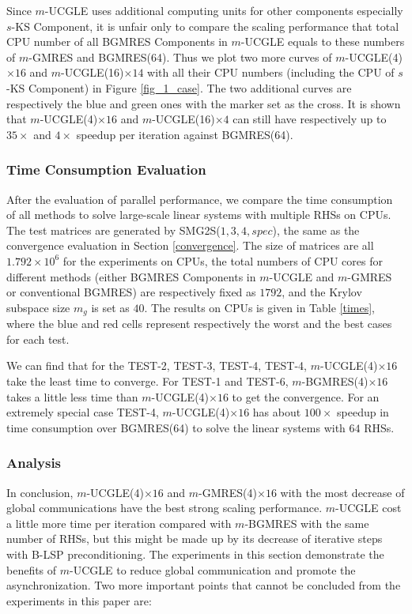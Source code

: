 Since $m$-UCGLE uses additional computing units for other components especially $s$-KS Component, it is unfair only to compare the scaling performance that total CPU number of all BGMRES Components in $m$-UCGLE equals to these numbers of $m$-GMRES and BGMRES(64). Thus we plot two more curves of $m$-UCGLE(4)$\times 16$ and $m$-UCGLE(16)$\times 14$ with all their CPU numbers (including the CPU of $s$-KS Component) in Figure \ref{fig_1_case}. The two additional curves are respectively the blue and green ones with the marker set as the cross. It is shown that $m$-UCGLE(4)$\times 16$ and $m$-UCGLE(16)$\times 4$ can still have respectively up to $35\times$ and $4 \times$ speedup per iteration against BGMRES(64).


\subsubsection{Time Consumption Evaluation}

After the evaluation of parallel performance, we compare the time consumption of all methods to solve large-scale linear systems with multiple RHSs on CPUs. The test matrices are generated by SMG2S($1,3,4, spec$), the same as the convergence evaluation in Section \ref{convergence}. The size of matrices are all $1.792 \times 10^6$ for the experiments on CPUs, the total numbers of CPU cores for different methods (either BGMRES Components in $m$-UCGLE and $m$-GMRES or conventional BGMRES) are respectively fixed as $1792$, and the Krylov subspace size $m_g$ is set as $40$. The results on CPUs is given in Table \ref{times}, where the blue and red cells represent respectively the worst and the best cases for each test.

We can find that for the TEST-2, TEST-3, TEST-4, TEST-4, $m$-UCGLE(4)$\times 16$ take the least time to converge. For TEST-1 and TEST-6, $m$-BGMRES(4)$\times 16$ takes a little less time than $m$-UCGLE(4)$\times 16$ to get the convergence. For an extremely special case TEST-4, $m$-UCGLE(4)$\times 16$ has about $100\times$ speedup in time consumption over BGMRES(64) to solve the linear systems with $64$ RHSs.

\subsubsection{Analysis}

In conclusion, $m$-UCGLE(4)$\times 16$ and $m$-GMRES(4)$\times 16$ with the most decrease of global communications have the best strong scaling performance. $m$-UCGLE cost a little more time per iteration compared with $m$-BGMRES with the same number of RHSs, but this might be made up by its decrease of iterative steps with B-LSP preconditioning. The experiments in this section demonstrate the benefits of $m$-UCGLE to reduce global communication and promote the asynchronization. Two more important points that cannot be concluded from the experiments in this paper are: 

